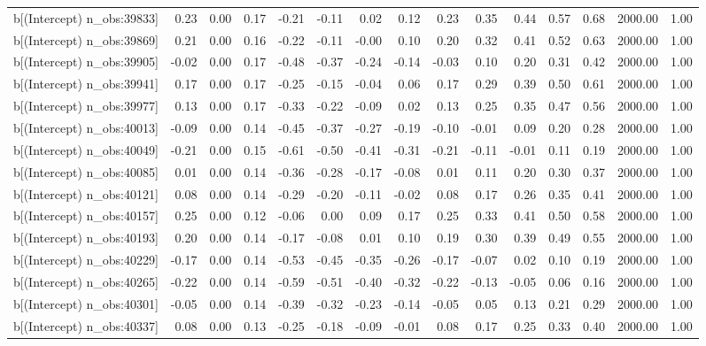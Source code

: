 \begin{table}[ht]
\begin{tabular}{rrrrrrrrrrrrrrr}
  b[(Intercept) n\_obs:39833] & 0.23 & 0.00 & 0.17 & -0.21 & -0.11 & 0.02 & 0.12 & 0.23 & 0.35 & 0.44 & 0.57 & 0.68 & 2000.00 & 1.00 \\ 
  b[(Intercept) n\_obs:39869] & 0.21 & 0.00 & 0.16 & -0.22 & -0.11 & -0.00 & 0.10 & 0.20 & 0.32 & 0.41 & 0.52 & 0.63 & 2000.00 & 1.00 \\ 
  b[(Intercept) n\_obs:39905] & -0.02 & 0.00 & 0.17 & -0.48 & -0.37 & -0.24 & -0.14 & -0.03 & 0.10 & 0.20 & 0.31 & 0.42 & 2000.00 & 1.00 \\ 
  b[(Intercept) n\_obs:39941] & 0.17 & 0.00 & 0.17 & -0.25 & -0.15 & -0.04 & 0.06 & 0.17 & 0.29 & 0.39 & 0.50 & 0.61 & 2000.00 & 1.00 \\ 
  b[(Intercept) n\_obs:39977] & 0.13 & 0.00 & 0.17 & -0.33 & -0.22 & -0.09 & 0.02 & 0.13 & 0.25 & 0.35 & 0.47 & 0.56 & 2000.00 & 1.00 \\ 
  b[(Intercept) n\_obs:40013] & -0.09 & 0.00 & 0.14 & -0.45 & -0.37 & -0.27 & -0.19 & -0.10 & -0.01 & 0.09 & 0.20 & 0.28 & 2000.00 & 1.00 \\ 
  b[(Intercept) n\_obs:40049] & -0.21 & 0.00 & 0.15 & -0.61 & -0.50 & -0.41 & -0.31 & -0.21 & -0.11 & -0.01 & 0.11 & 0.19 & 2000.00 & 1.00 \\ 
  b[(Intercept) n\_obs:40085] & 0.01 & 0.00 & 0.14 & -0.36 & -0.28 & -0.17 & -0.08 & 0.01 & 0.11 & 0.20 & 0.30 & 0.37 & 2000.00 & 1.00 \\ 
  b[(Intercept) n\_obs:40121] & 0.08 & 0.00 & 0.14 & -0.29 & -0.20 & -0.11 & -0.02 & 0.08 & 0.17 & 0.26 & 0.35 & 0.41 & 2000.00 & 1.00 \\ 
  b[(Intercept) n\_obs:40157] & 0.25 & 0.00 & 0.12 & -0.06 & 0.00 & 0.09 & 0.17 & 0.25 & 0.33 & 0.41 & 0.50 & 0.58 & 2000.00 & 1.00 \\ 
  b[(Intercept) n\_obs:40193] & 0.20 & 0.00 & 0.14 & -0.17 & -0.08 & 0.01 & 0.10 & 0.19 & 0.30 & 0.39 & 0.49 & 0.55 & 2000.00 & 1.00 \\ 
  b[(Intercept) n\_obs:40229] & -0.17 & 0.00 & 0.14 & -0.53 & -0.45 & -0.35 & -0.26 & -0.17 & -0.07 & 0.02 & 0.10 & 0.19 & 2000.00 & 1.00 \\ 
  b[(Intercept) n\_obs:40265] & -0.22 & 0.00 & 0.14 & -0.59 & -0.51 & -0.40 & -0.32 & -0.22 & -0.13 & -0.05 & 0.06 & 0.16 & 2000.00 & 1.00 \\ 
  b[(Intercept) n\_obs:40301] & -0.05 & 0.00 & 0.14 & -0.39 & -0.32 & -0.23 & -0.14 & -0.05 & 0.05 & 0.13 & 0.21 & 0.29 & 2000.00 & 1.00 \\ 
  b[(Intercept) n\_obs:40337] & 0.08 & 0.00 & 0.13 & -0.25 & -0.18 & -0.09 & -0.01 & 0.08 & 0.17 & 0.25 & 0.33 & 0.40 & 2000.00 & 1.00 \\ 

\end{tabular}
\end{table}
